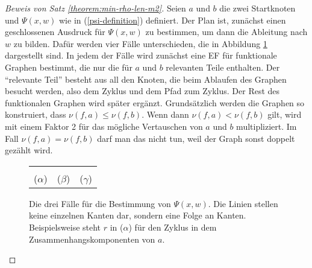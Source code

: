 \documentclass[a4paper, 10pt, ngerman]{article}
\begin{document}
    \begin{proof}[Beweis von Satz \ref{theorem:min-rho-len-m2}]
        Seien $a$ und $b$ die zwei Startknoten und $\Psi(x, w)$ wie in (\ref{psi-definition}) definiert. Der Plan ist, zunächst einen geschlossenen Ausdruck für $\Psi(x, w)$ zu bestimmen, um dann die Ableitung nach $w$ zu bilden. Dafür werden vier Fälle unterschieden, die in Abbildung \ref{fig:psi-construction} dargestellt sind. In jedem der Fälle wird zunächst eine EF für funktionale Graphen bestimmt, die nur die für $a$ und $b$ relevanten Teile enthalten. Der "`relevante Teil"' besteht aus all den Knoten, die beim Ablaufen des Graphen besucht werden, also dem Zyklus und dem Pfad zum Zyklus. Der Rest des funktionalen Graphen wird später ergänzt. Grundsätzlich werden die Graphen so konstruiert, dass $\nu(f, a) \le \nu(f, b)$. Wenn dann $\nu(f, a) < \nu(f, b)$ gilt, wird mit einem Faktor 2 für das mögliche Vertauschen von $a$ und $b$ multipliziert. Im Fall $\nu(f, a) = \nu(f, b)$ darf man das nicht tun, weil der Graph sonst doppelt gezählt wird.

        \begin{figure}
            \begin{tabular}{ccc}
                 &  &  \\
                ($\alpha$)                           & ($\beta$)                           & ($\gamma$)
            \end{tabular}
            \caption{Die drei Fälle für die Bestimmung von $\Psi(x, w)$. Die Linien stellen keine einzelnen Kanten dar, sondern eine Folge an Kanten. Beispielsweise steht $r$ in ($\alpha$) für den Zyklus in dem Zusammenhangskomponenten von $a$.}
            \label{fig:psi-construction}
        \end{figure}


\end{proof}
\end{document}
